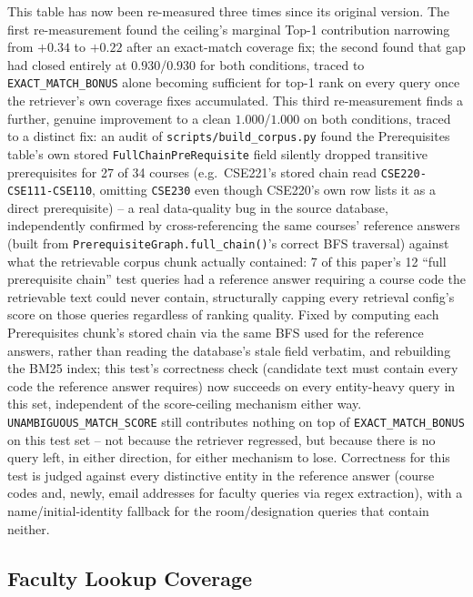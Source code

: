 \documentclass[a4paper,twoside]{article}
\begin{document}
This table has now been re-measured three times since its original version. The first re-measurement found the ceiling's marginal Top-1 contribution narrowing from $+0.34$ to $+0.22$ after an exact-match coverage fix; the second found that gap had closed entirely at $0.930$/$0.930$ for both conditions, traced to \texttt{EXACT\_MATCH\_BONUS} alone becoming sufficient for top-1 rank on every query once the retriever's own coverage fixes accumulated. This third re-measurement finds a further, genuine improvement to a clean $1.000$/$1.000$ on both conditions, traced to a distinct fix: an audit of \texttt{scripts/build\_corpus.py} found the Prerequisites table's own stored \texttt{FullChainPreRequisite} field silently dropped transitive prerequisites for 27 of 34 courses (e.g.\ CSE221's stored chain read \texttt{CSE220-CSE111-CSE110}, omitting \texttt{CSE230} even though CSE220's own row lists it as a direct prerequisite) -- a real data-quality bug in the source database, independently confirmed by cross-referencing the same courses' reference answers (built from \texttt{PrerequisiteGraph.full\_chain()}'s correct BFS traversal) against what the retrievable corpus chunk actually contained: 7 of this paper's 12 ``full prerequisite chain'' test queries had a reference answer requiring a course code the retrievable text could never contain, structurally capping every retrieval config's score on those queries regardless of ranking quality. Fixed by computing each Prerequisites chunk's stored chain via the same BFS used for the reference answers, rather than reading the database's stale field verbatim, and rebuilding the BM25 index; this test's correctness check (candidate text must contain every code the reference answer requires) now succeeds on every entity-heavy query in this set, independent of the score-ceiling mechanism either way. \texttt{UNAMBIGUOUS\_MATCH\_SCORE} still contributes nothing on top of \texttt{EXACT\_MATCH\_BONUS} on this test set -- not because the retriever regressed, but because there is no query left, in either direction, for either mechanism to lose. Correctness for this test is judged against every distinctive entity in the reference answer (course codes and, newly, email addresses for faculty queries via regex extraction), with a name/initial-identity fallback for the room/designation queries that contain neither.

\subsection{Faculty Lookup Coverage}
\label{subsec:faculty-coverage}
\end{document}
